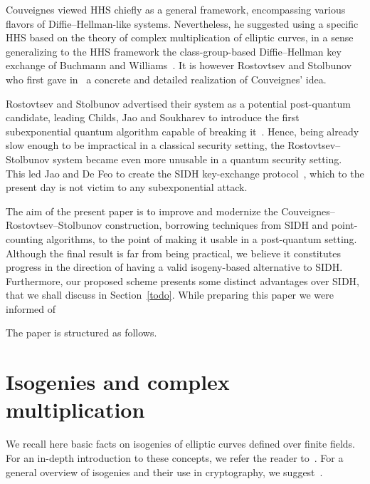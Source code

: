\documentclass{article}
\theoremstyle{definition}
\begin{document}
Couveignes viewed HHS chiefly as a general framework, encompassing
various flavors of Diffie--Hellman-like systems. Nevertheless, he
suggested using a specific HHS based on the theory of complex
multiplication of elliptic curves, in a sense generalizing to the HHS
framework the class-group-based Diffie--Hellman key exchange of
Buchmann and Williams~\cite{Buchmann1988}. It is however Rostovtsev
and Stolbunov who first gave in~\cite{rostovtsev+stolbunov06} a
concrete and detailed realization of Couveignes' idea.

Rostovtsev and Stolbunov advertised their system as a potential
post-quantum candidate, leading Childs, Jao and Soukharev to introduce
the first subexponential quantum algorithm capable of breaking
it~\cite{childs2014constructing}. Hence, being already slow enough to
be impractical in a classical security setting, the
Rostovtsev--Stolbunov system became even more unusable in a quantum
security setting. This led Jao and De Feo to create the SIDH
key-exchange protocol~\cite{jao+defeo2011}, which to the present day
is not victim to any subexponential attack.

The aim of the present paper is to improve and modernize the
Couveignes--Rostovtsev--Stolbunov construction, borrowing techniques
from SIDH and point-counting algorithms, to the point of making it
usable in a post-quantum setting. Although the final result is far
from being practical, we believe it constitutes progress in the
direction of having a valid isogeny-based alternative to SIDH.
Furthermore, our proposed scheme presents some distinct advantages
over SIDH, that we shall discuss in Section~\ref{todo}. While
preparing this paper we were informed of

The paper is structured as follows.

\section{Isogenies and complex multiplication}
\label{sec:math}

We recall here basic facts on isogenies of elliptic curves defined
over finite fields. For an in-depth introduction to these concepts, we
refer the reader to~\cite{silverman:elliptic}. For a general
overview of isogenies and their use in cryptography, we
suggest~\cite{defeo2017isogenybased}.
\end{document}

